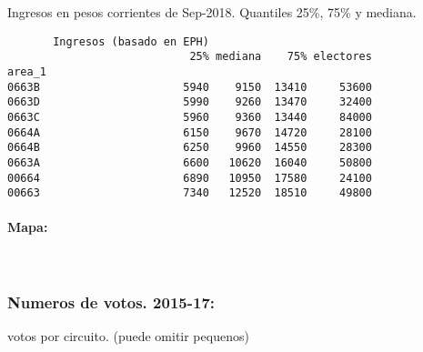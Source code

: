 \documentclass[11pt]{article}
\begin{document}
    
    Ingresos en pesos corrientes de Sep-2018. Quantiles 25\%, 75\% y
mediana.

    
    
    \begin{verbatim}
       Ingresos (basado en EPH)                         
                            25% mediana    75% electores
area_1                                                  
0663B                      5940    9150  13410     53600
0663D                      5990    9260  13470     32400
0663C                      5960    9360  13440     84000
0664A                      6150    9670  14720     28100
0664B                      6250    9960  14550     28300
0663A                      6600   10620  16040     50800
00664                      6890   10950  17580     24100
00663                      7340   12520  18510     49800
    \end{verbatim}

    
    \hypertarget{mapa}{%
\paragraph{Mapa:}\label{mapa}}

    
    \begin{center}
    \end{center}
    { \hspace*{\fill} \\}
    
    \hypertarget{numeros-de-votos.-2015-17}{%
\subsubsection{Numeros de votos.
2015-17:}\label{numeros-de-votos.-2015-17}}

    
    votos por circuito. (puede omitir pequenos)

    
    
\end{document}
